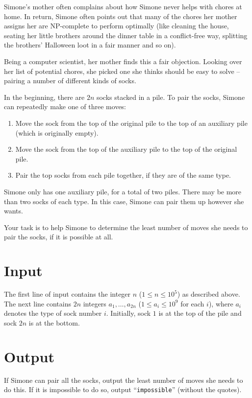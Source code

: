 
%
\noindent
Simone's mother often complains about how Simone never helps with chores at home. In return, Simone often points
out that many of the chores her mother assigns her are NP-complete to perform optimally (like cleaning the house,
seating her little brothers around the dinner table in a conflict-free way, splitting the brothers' Halloween loot
in a fair manner and so on).

Being a computer scientist, her mother finds this a fair objection. Looking over her list of potential chores, she
picked one she thinks should be easy to solve -- pairing a number of different kinds of socks.

In the beginning, there are $2n$ socks stacked in a pile. To pair the socks, Simone can repeatedly make one of three moves:

\begin{enumerate}

  \item Move the sock from the top of the original pile to the top of an auxiliary pile (which is originally empty).
  \item Move the sock from the top of the auxiliary pile to the top of the original pile.
  \item Pair the top socks from each pile together, if they are of the same type.

\end{enumerate}

Simone only has one auxiliary pile, for a total of two piles. There may be more than two socks of each type.
In this case, Simone can pair them up however she wants.

Your task is to help Simone to determine the least number of moves she needs to pair the socks, if it is possible at all.

\section*{Input}
The first line of input contains the integer $n$ ($1 \le n \le 10^5$) as described above.
The next line contains $2n$ integers $a_1, \ldots, a_{2n}$ ($1 \le a_i \le 10^9$ for each $i$), where $a_i$ denotes the type of sock number $i$. Initially,
sock $1$ is at the top of the pile and sock $2n$ is at the bottom.

\section*{Output}
If Simone can pair all the socks, output the least number of moves she needs to do this.
If it is impossible to do so, output ``\texttt{impossible}'' (without the quotes).
